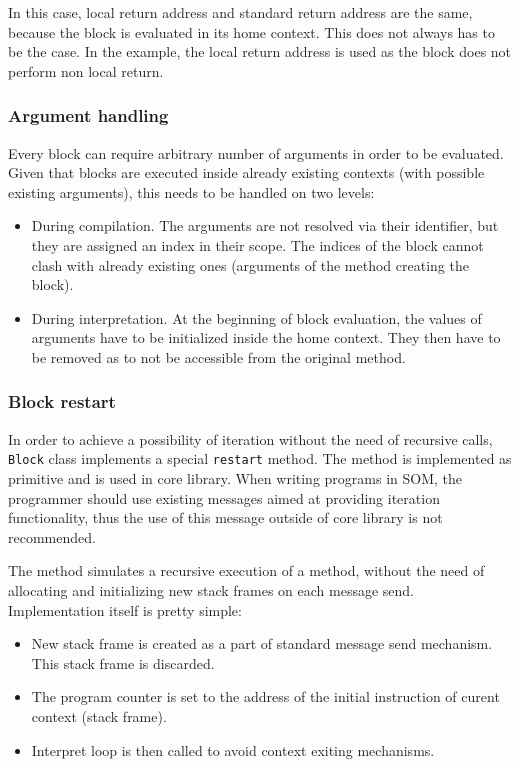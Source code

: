 \documentclass[thesis=M,english]{FITthesis}[2019/12/23]
\begin{document}
In this case, local return address and standard return address are the same, because the block is evaluated in its home context.
This does not always has to be the case. In the example, the local return address is used as the block does not perform non local
return.

\subsubsection{Argument handling}
Every block can require arbitrary number of arguments in order to be evaluated. Given that blocks are executed inside already existing
contexts (with possible existing arguments), this needs to be handled on two levels:
\begin{itemize}
	\item During compilation. The arguments are not resolved via their identifier, but they are assigned an index in their scope.
		The indices of the block cannot clash with already existing ones (arguments of the method creating the block).
	\item During interpretation. At the beginning of block evaluation, the values of arguments have to be initialized inside the home context.
		They then have to be removed as to not be accessible from the original method.
\end{itemize}

\subsubsection{Block restart}
In order to achieve a possibility of iteration without the need of recursive calls, \texttt{Block} class implements a special \texttt{restart} method.
The method is implemented as primitive and is used in core library. When writing programs in SOM, the programmer should use existing messages aimed at
providing iteration functionality, thus the use of this message outside of core library is not recommended.

The method simulates a recursive execution of a method, without the need of allocating and initializing new stack frames on each message send.
Implementation itself is pretty simple:
\begin{itemize}
	\item New stack frame is created as a part of standard message send mechanism. This stack frame is discarded.
	\item The program counter is set to the address of the initial instruction of curent context (stack frame).
	\item Interpret loop is then called to avoid context exiting mechanisms.
\end{itemize}
\end{document}

